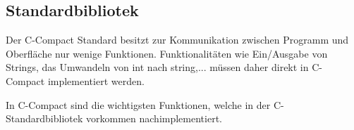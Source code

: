 
\subsection{Standardbibliotek}

Der C-Compact Standard besitzt zur Kommunikation zwischen Programm und Oberfläche nur wenige Funktionen. Funktionalitäten wie Ein/Ausgabe von Strings, das Umwandeln von int nach string,... müssen daher direkt in C-Compact implementiert werden.

In C-Compact sind die wichtigsten Funktionen, welche in der C-Standardbibliotek vorkommen nachimplementiert.